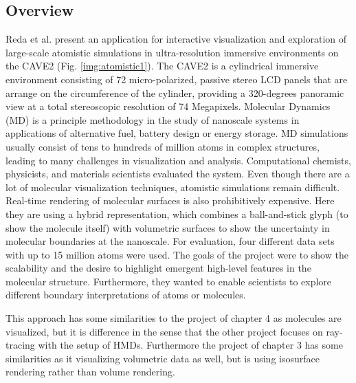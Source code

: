 \documentclass[10pt,twocolumn,letterpaper]{article}
\begin{document}
\subsection{Overview}
Reda et al. \cite{reda_visualizing_2013} present an application for interactive visualization and exploration of large-scale atomistic simulations in ultra-resolution immersive environments on the CAVE2 \cite{febretti2013cave2} (Fig. \ref{img:atomistic1}). The CAVE2 is a cylindrical immersive environment consisting of 72 micro-polarized, passive stereo LCD panels that are arrange on the circumference of the cylinder, providing a 320-degrees panoramic view at a total stereoscopic resolution of 74 Megapixels. Molecular Dynamics (MD) is a principle methodology in the study of nanoscale systems in applications of alternative fuel, battery design or energy storage. MD simulations usually consist of tens to hundreds of million atoms in complex structures, leading to many challenges in visualization and analysis. Computational chemists, physicists, and materials scientists evaluated the system. Even though there are a lot of molecular visualization techniques, atomistic simulations remain difficult. Real-time rendering of molecular surfaces is also prohibitively expensive. Here they are using a hybrid representation, which combines a ball-and-stick glyph (to show the molecule itself) with volumetric surfaces to show the uncertainty in molecular boundaries at the nanoscale. For evaluation, four different data sets with up to 15 million atoms were used. The goals of the project were to show the scalability and the desire to highlight emergent high-level features in the molecular structure. Furthermore, they wanted to enable scientists to explore different boundary interpretations of atoms or molecules.

\setlength{\parindent}{1pc}This approach has some similarities to the project of chapter 4 as molecules are visualized, but it is difference in the sense that the other project focuses on ray-tracing with the setup of HMDs. Furthermore the project of chapter 3 has some similarities as it visualizing volumetric data as well, but is using isosurface rendering rather than volume rendering.
\end{document}
